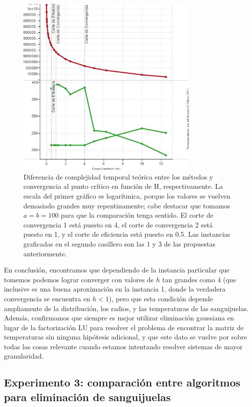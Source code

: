 \begin{figure}[H]
    \centering
    \includegraphics[width=0.8\textwidth]{Eficiencia de LU vs Gaussiana}
    \caption{Diferencia de complejidad temporal teórica entre los métodos y convergencia al punto crítico en función de H, respectivamente. La escala del primer gráfico es logarítmica, porque los valores se vuelven demasiado grandes muy repentinamente; cabe destacar que tomamos $a = b = 100$ para que la comparación tenga sentido. El corte de convergencia 1 está puesto en 4, el corte de convergencia 2 está puesto en 1, y el corte de eficiencia está puesto en 0.5. Las instancias graficadas en el segundo casillero son las 1 y 3 de las propuestas anteriormente.}
    \label{fig:exp21-cmp}
\end{figure}


En conclusión, encontramos que dependiendo de la instancia particular que tomemos podemos lograr converger con valores de $h$ tan grandes como $4$ (que inclusive es una buena aproximación en la instancia 1, donde la verdadera convergencia se encuentra en $h < 1$), pero que esta condición depende ampliamente de la distribución, los radios, y las temperaturas de las sanguijuelas. Además, confirmamos que siempre es mejor utilizar eliminación gaussiana en lugar de la factorización LU para resolver el problema de encontrar la matriz de temperaturas sin ninguna hipótesis adicional, y que este dato se vuelve por sobre todas las cosas relevante cuando estamos intentando resolver sistemas de mayor granularidad.

\subsection{Experimento 3: comparación entre algoritmos para eliminación de sanguijuelas}

